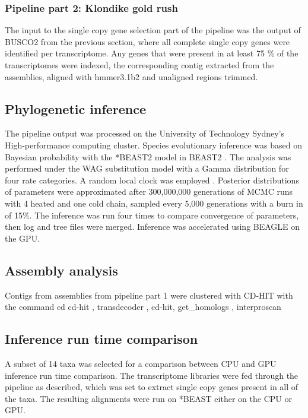 \documentclass[12pt]{article}
\begin{document}
\subsubsection*{Pipeline part 2: Klondike gold rush}
The input to the single copy gene selection part of the pipeline was the output of BUSCO2 from the previous section, where all complete single copy genes were identified per transcriptome. 
Any genes that were present in at least 75 \% of the transcriptomes were indexed, the corresponding contig extracted from the assemblies, aligned with hmmer3.1b2 \cite{eddy2015hmmer} and unaligned regions trimmed.
\subsection*{Phylogenetic inference}
The pipeline output was processed on the University of Technology Sydney's High-performance computing cluster.
Species evolutionary inference was based on Bayesian probability with the *BEAST2 model in BEAST2 \cite{bouckaert2014beast}. 
The analysis was performed under the WAG substitution model \cite{whelan2001general} with a Gamma distribution for four rate categories. 
A random local clock was employed \cite{drummond2010bayesian}. 
Posterior distributions of parameters were approximated after 300,000,000 generations of MCMC runs with 4 heated and one cold chain, sampled every 5,000 generations  with a burn in of 15\%. 
The inference was run four times to compare convergence of parameters, then log and tree files were merged. 
Inference was accelerated using BEAGLE \cite{ayres2011beagle} on the GPU.

\subsection*{Assembly analysis}
Contigs from assemblies from pipeline part 1 were clustered with CD-HIT with the command cd 
cd-hit \cite{fu2012cd}, transdecoder \cite{haas2016transdecoder}, cd-hit, get\_homologs \cite{contreras2013gethom}, interproscan \cite{quevillon2005interproscan}
\subsection*{Inference run time comparison}
A subset of 14 taxa was selected for a comparison between CPU and GPU inference run time comparison. 
The transcriptome libraries were fed through the pipeline as described, which was set to extract single copy genes present in all of the taxa. 
The resulting alignments were run on *BEAST either on the CPU or GPU.
\end{document}
